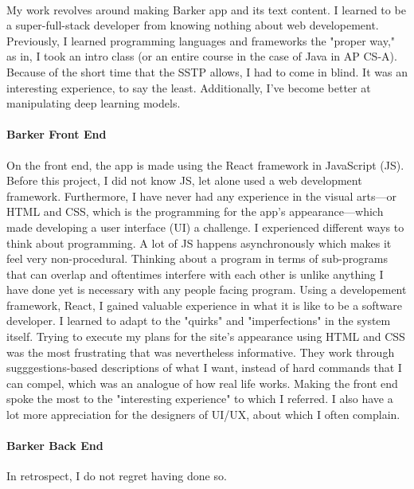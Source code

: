 \documentclass[12pt, letterpaper]{article}
\begin{document}
\paragraph{}My work revolves around making Barker app and its text content. I learned to be a super-full-stack developer from knowing nothing about web developement. Previously, I learned programming languages and frameworks the "proper way," as in, I took an intro class (or an entire course in the case of Java in AP CS-A). Because of the short time that the SSTP allows, I had to come in blind. It was an interesting experience, to say the least. Additionally, I've become better at manipulating deep learning models. 


\paragraph{Barker Front End} On the front end, the app is made using the React framework in JavaScript (JS). Before this project, I did not know JS, let alone used a web development framework. Furthermore, I have never had any experience in the visual arts---or HTML and CSS, which is the programming for the app's appearance---which made developing a user interface (UI) a challenge. I experienced different ways to think about programming. A lot of JS happens asynchronously which makes it feel very non-procedural. Thinking about a program in terms of sub-programs that can overlap and oftentimes interfere with each other is unlike anything I have done yet is necessary with any people facing program. Using a developement framework, React, I gained valuable experience in what it is like to be a software developer. I learned to adapt to the "quirks" and "imperfections" in the system itself. Trying to execute my plans for the site's appearance using HTML and CSS was the most frustrating that was nevertheless informative. They work through sugggestions-based descriptions of what I want, instead of hard commands that I can compel, which was an analogue of how real life works. Making the front end spoke the most to the "interesting experience" to which I referred. I also have a lot more appreciation for the designers of UI/UX, about which I often complain.

\paragraph{Barker Back End}

In retrospect, I do not regret having done so. 
\end{document}
